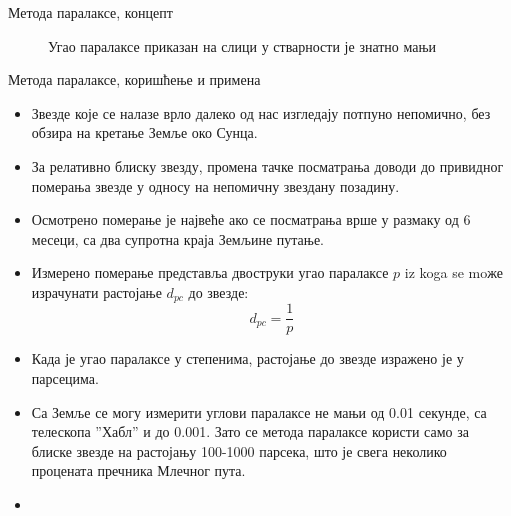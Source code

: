\documentclass[aspectratio=169, xcolor=table, 10pt]{beamer}
\theoremstyle{definition}
\begin{document}
\begin{frame}{Метода паралаксе, концепт}
  \begin{figure}
    \centering
    \captionsetup{width=\wd0}
    \caption{Угао паралаксе приказан на слици у стварности је знатно мањи}
  \end{figure}
\end{frame}

\begin{frame}{Метода паралаксе, коришћење и примена}
  \begin{itemize}
    \item Звезде које се налазе врло далеко од нас изгледају потпуно непомично, без обзира на кретање Земље око Сунца.
    \item За релативно блиску звезду, промена тачке посматрања доводи до привидног померања звезде у односу на непомичну звездану позадину.
    \item Осмотрено померање је највеће ако се посматрања врше у размаку од 6 месеци, са два супротна краја Земљине путање.
    \item Измерено померање представља двоструки угао паралаксе $p$ iz koga se moже израчунати растојање $d_{pc}$ до звезде:
      \begin{equation*}
        d_{pc}=\frac{1}{p}
      \end{equation*}
    \item Када је угао паралаксе у степенима, растојање до звезде изражено је у парсецима.
    \item Са Земље се могу измерити углови паралаксе не мањи од 0.01 секунде, са телескопа ”Хабл” и до 0.001. Зато се метода паралаксе користи само за блиске звезде на растојању 100-1000 парсека, што је свега неколико процената пречника Млечног пута.
  \end{itemize}
\end{frame}

\begin{frame}
  \begin{itemize}
    \item
  \end{itemize}
\end{frame}
\end{document}
